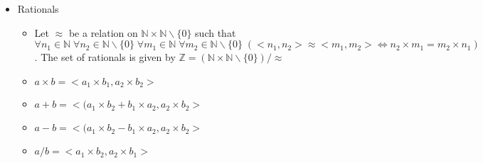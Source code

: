 \documentclass[11pt, twocolumn]{article}
\newenvironment{compactitem}
{\begin{itemize}
  \setlength{\itemsep}{1px}
  \setlength{\parskip}{0pt}
  \setlength{\parsep}{0pt}}
{\end{itemize}}
\begin{document}
\begin{compactitem}
\begin{compactitem}
\item $a-b = <a_1+b_2, a_2+b_1>$
\item $a\times b = <a_1\times b_2+a_2\times b_1, a_1\times b_1+a_2\times b_2 >$
\end{compactitem}
\item Rationals
\begin{compactitem}
\item Let $\approx$ be a relation on $\mathbb{N} \times \mathbb{N}\backslash\{0\}$ such that $\forall n_1 \in \mathbb{N} \; \forall n_2 \in \mathbb{N}\backslash \{0\} \; \forall m_1 \in \mathbb{N} \; \forall m_2 \in \mathbb{N}\backslash\{0\} \;(<n_1, n_2> \approx <m_1, m_2> \Leftrightarrow n_2\times m_1=m_2\times n_1)$. The set of rationals is given by $\mathbb{Z} = (\mathbb{N} \times \mathbb{N}\backslash \{0\})/\approx$
\item $a\times b = <a_1\times b_1, a_2\times b_2>$
\item $a+b = <(a_1\times b_2+b_1\times a_2, a_2\times b_2>$
\item $a-b = <(a_1\times b_2-b_1\times a_2, a_2\times b_2>$
\item $a/b = <a_1\times b_2, a_2\times b_1>$
\end{compactitem}
\end{compactitem}
\end{document}

